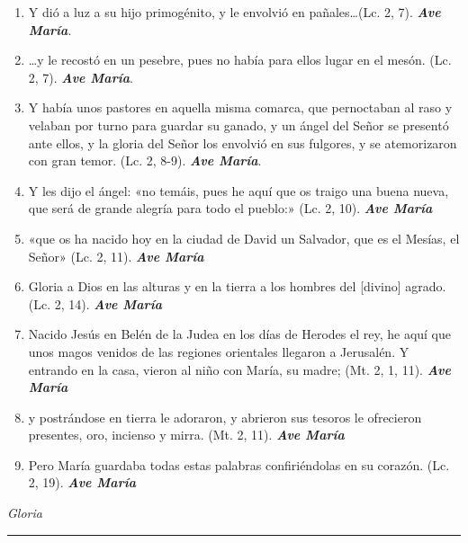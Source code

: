 \documentclass[a4paper,11pt, oneside]{report}
\begin{document}
{{\begin{enumerate}
      \item Y dió a luz a su hijo primogénito, y le envolvió en pañales\ldots (Lc. 2, 7). \textbf{\textit{Ave María}}.

      \item \ldots y le recostó en un pesebre, pues no había para ellos lugar en el mesón. (Lc. 2, 7). \textbf{\textit{Ave María}}.

      \item Y había unos pastores en aquella misma comarca, que pernoctaban al raso y velaban por turno para guardar su ganado, y un ángel
      del Señor se presentó ante ellos, y la gloria del Señor los envolvió en sus fulgores, y se atemorizaron con gran temor. (Lc. 2, 8-9). \textbf{\textit{Ave María}}.

      \item Y les dijo el ángel: «no temáis, pues he aquí que os traigo una buena nueva, que será de grande alegría para todo el pueblo:» (Lc. 2, 10). \textbf{\textit{Ave María}}

      \item «que os ha nacido hoy en la ciudad de David un Salvador, que es el Mesías, el Señor» (Lc. 2, 11). \textbf{\textit{Ave María}}

      \item Gloria a Dios en las alturas y en la tierra a los hombres del [divino] agrado. (Lc. 2, 14). \textbf{\textit{Ave María}}

      \item Nacido Jesús en Belén de la Judea en los días de Herodes el rey, he aquí que unos magos venidos de las regiones orientales llegaron a Jerusalén.
      Y entrando en la casa, vieron al niño con María, su madre; (Mt. 2, 1, 11). \textbf{\textit{Ave María}}

      \item y postrándose en tierra le adoraron, y abrieron sus tesoros le ofrecieron presentes, oro, incienso y mirra. (Mt. 2, 11). \textbf{\textit{Ave María}}

      \item Pero María guardaba todas estas palabras confiriéndolas en su corazón. (Lc. 2, 19). \textbf{\textit{Ave María}}
    \end{enumerate}
    \indent\textit{Gloria}  
      
    \begin{center}\rule{1\linewidth}{\linethickness}\end{center}
    
}}
\end{document}
